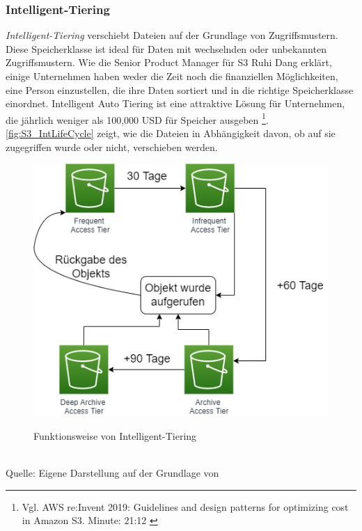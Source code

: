 \subsubsection{Intelligent-Tiering}
\textit{Intelligent-Tiering} verschiebt Dateien auf der Grundlage von Zugriffsmustern. Diese Speicherklasse ist ideal für Daten mit wechselnden oder unbekannten Zugriffsmustern. 
Wie die Senior Product Manager für S3 Ruhi Dang erklärt, einige Unternehmen haben weder die Zeit noch die finanziellen Möglichkeiten, eine Person einzustellen, die ihre Daten sortiert und in die richtige Speicherklasse einordnet. Intelligent Auto Tiering ist eine attraktive Lösung für Unternehmen, die jährlich weniger als 100,000 USD für Speicher ausgeben \footnote{Vgl. AWS re:Invent 2019: Guidelines and design patterns for optimizing cost in Amazon S3. Minute: 21:12 \cite{AMZ16}}.
\autoref{fig:S3_IntLifeCycle} zeigt, wie die Dateien in Abhängigkeit davon, ob auf sie zugegriffen wurde oder nicht, verschieben werden. 
\begin{figure}[h!]
  \centering
  \includegraphics[scale=0.7]{sources/S3_IntLifeCycle}
  \caption[Funktionsweise von Intelligent-Tiering]{}\label{fig:S3_IntLifeCycle} Funktionsweise von Intelligent-Tiering
\end{figure}\\
Quelle: Eigene Darstellung auf der Grundlage von \\
